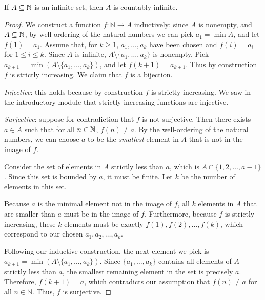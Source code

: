\documentclass[../analysis1.tex]{subfiles}
\begin{document}
\begin{theorem}
    \begin{shaded*}
        If $A\subseteq\mathbb{N}$ is an infinite set, then $A$ is countably infinite.
    \end{shaded*}
\end{theorem}
\begin{proof}
    We construct a function $f:\mathbb{N}\to A$ inductively: since $A$ is nonempty, and $A\subseteq\mathbb{N}$,
    by well-ordering of the natural numbers we can pick $a_1=\min A$, and let $f(1)=a_1$. Assume that, for $k\ge 1$, $a_1,\dots,a_k$
    have been chosen and $f(i)=a_i$ for $1\le i \le k$. Since $A$ is
    infinite, $A\setminus\{a_1,\dots,a_k\}$ is nonempty. Pick $a_{k+1}=\min\left(A\setminus\{a_1,\dots,a_k\}\right)$,
    and let $f(k+1)=a_{k+1}$. Thus by construction $f$ is strictly increasing. We claim that $f$ is a bijection.
    
        \textit{Injective}: this holds because by construction $f$ is strictly increasing. We saw in the introductory module that strictly increasing functions are injective.

    \textit{Surjective}: suppose for contradiction that $f$ is not surjective. Then there exists
        $a\in A$ such that for all $n\in\mathbb{N}$, $f(n)\ne a$. By the well-ordering of the natural numbers, we can choose $a$ to be the \textit{smallest} element in $A$ that is not in the image of $f$. 

        Consider the set of elements in $A$ strictly less than $a$, which is $A \cap \{1, 2, \dots, a-1\}$. Since this set is bounded by $a$, it must be finite. Let $k$ be the number of elements in this set. 
        
        Because $a$ is the minimal element not in the image of $f$, all $k$ elements in $A$ that are smaller than $a$ must be in the image of $f$. Furthermore, because $f$ is strictly increasing, these $k$ elements must be exactly $f(1), f(2), \dots, f(k)$, which correspond to our chosen $a_1, a_2, \dots, a_k$.
        
        Following our inductive construction, the next element we pick is $a_{k+1} = \min(A \setminus \{a_1, \dots, a_k\})$. Since $\{a_1, \dots, a_k\}$ contains all elements of $A$ strictly less than $a$, the smallest remaining element in the set is precisely $a$. Therefore, $f(k+1) = a$, which contradicts our assumption that $f(n) \neq a$ for all $n \in \mathbb{N}$. Thus, $f$ is surjective.\qedhere
\end{proof}
\end{document}
